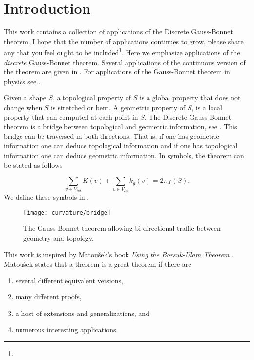 \section{Introduction}
\label{sec:intro}

This work contains a collection of applications of the 
Discrete Gauss-Bonnet theorem.
I hope that the number of applications continues to grow,
please share any that you feel
ought to  be included\footnote{}.
Here we emphasize applications of the \emph{discrete} Gauss-Bonnet
theorem. 
Several applications of the continuous version of the theorem
are given in \cite{doc76}.
For applications of the Gauss-Bonnet theorem in physics see \cite{tirado-physics-apps}.


Given a shape $S$, a topological property of $S$ is a global property that does
not change when $S$ is stretched or bent.
A geometric property of $S$, is a local property that can computed at each point in $S$.
The Discrete Gauss-Bonnet theorem is a bridge between topological
and geometric information, see . This bridge can be traversed in both directions.
That is, if one has geometric information one can deduce topological information and
if one has topological information one can deduce geometric information.
In symbols, the theorem can be stated as follows

\begin{equation} \label{eqn:g-b}
\sum_{v\in V_{int}} K(v) + \sum_{v\in V_{\partial S}} k_g(v) = 2\pi \chi(S).
\end{equation}
We define these symbols in .


\begin{figure}[htb]
\centering
\texttt{[image: curvature/bridge]}
\caption{The Gauss-Bonnet theorem allowing bi-directional traffic
between geometry and topology.}
\label{fig:bridge}
\end{figure}

This work is inspired by Matou\v{s}ek's book \emph{Using the Borsuk-Ulam Theorem}
\cite{jm08}.
Matou\v{s}ek states that a theorem is a great theorem if there are
\begin{enumerate}[(1)]
\item several different equivalent versions,
\item many different proofs,
\item a host of extensions and generalizations, and
\item numerous interesting applications.
\end{enumerate}

